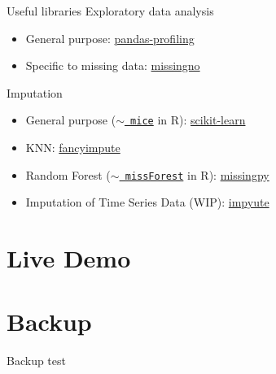 \documentclass[aspectratio=43]{beamer}
\begin{document}
\begin{frame}{Useful libraries}
Exploratory data analysis
\begin{itemize}
\item General purpose: \href{https://github.com/pandas-profiling/pandas-profiling}{pandas-profiling}
\item Specific to missing data: \href{https://github.com/ResidentMario/missingno}{missingno}
\end{itemize}
Imputation
\begin{itemize}
\item General purpose ($\sim$\href{https://cran.r-project.org/web/packages/mice/mice.pdf}{\texttt{ mice}} in R): \href{https://scikit-learn.org/stable/modules/impute.html}{scikit-learn}
\item KNN: \href{https://github.com/iskandr/fancyimpute}{fancyimpute}
\item Random Forest ($\sim$\href{https://cran.r-project.org/web/packages/missForest/missForest.pdf}{\texttt{ missForest}} in R): \href{https://github.com/epsilon-machine/missingpy}{missingpy}
\item Imputation of Time Series Data (WIP): \href{https://github.com/eltonlaw/impyute}{impyute}
\end{itemize}
\end{frame}




\section{Live Demo}

\appendix
\section{Backup}

\begin{frame}{Backup}
\scriptsize
test
\normalsize
\end{frame}
\end{document}
